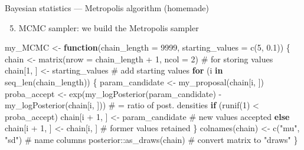 \documentclass[
  ignorenonframetext,
  aspectratio=169,
  t]{beamer}
\newenvironment{Shaded}{\begin{snugshade}}{\end{snugshade}}
\newcommand{\AttributeTok}[1]{\textcolor[rgb]{0.40,0.45,0.13}{#1}}
\newcommand{\CommentTok}[1]{\textcolor[rgb]{0.37,0.37,0.37}{#1}}
\newcommand{\ControlFlowTok}[1]{\textcolor[rgb]{0.00,0.23,0.31}{\textbf{#1}}}
\newcommand{\DecValTok}[1]{\textcolor[rgb]{0.68,0.00,0.00}{#1}}
\newcommand{\FloatTok}[1]{\textcolor[rgb]{0.68,0.00,0.00}{#1}}
\newcommand{\FunctionTok}[1]{\textcolor[rgb]{0.28,0.35,0.67}{#1}}
\newcommand{\NormalTok}[1]{\textcolor[rgb]{0.00,0.23,0.31}{#1}}
\newcommand{\OtherTok}[1]{\textcolor[rgb]{0.00,0.23,0.31}{#1}}
\newcommand{\SpecialCharTok}[1]{\textcolor[rgb]{0.37,0.37,0.37}{#1}}
\newcommand{\StringTok}[1]{\textcolor[rgb]{0.13,0.47,0.30}{#1}}
\providecommand{\tightlist}{%
  \setlength{\itemsep}{0pt}\setlength{\parskip}{0pt}}
\newcommand{\bluenorm}[1]{\textcolor{bluebeamer}{#1}}
\begin{document}
\begin{frame}[fragile]{Bayesian statistics --- Metropolis algorithm
(homemade)}
\protect{}\label{bayesian-statistics-metropolis-algorithm-homemade-4}
\begin{enumerate}
\setcounter{enumi}{4}
\tightlist
\item
  \bluenorm{MCMC sampler}: we build the Metropolis sampler
\end{enumerate}

\footnotesize

\begin{Shaded}
\begin{Highlighting}[]
\NormalTok{my\_MCMC }\OtherTok{\textless{}{-}} \ControlFlowTok{function}\NormalTok{(}\AttributeTok{chain\_length =} \DecValTok{9999}\NormalTok{, }\AttributeTok{starting\_values =} \FunctionTok{c}\NormalTok{(}\DecValTok{5}\NormalTok{, }\FloatTok{0.1}\NormalTok{)) \{}
\NormalTok{    chain }\OtherTok{\textless{}{-}} \FunctionTok{matrix}\NormalTok{(}\AttributeTok{nrow =}\NormalTok{ chain\_length }\SpecialCharTok{+} \DecValTok{1}\NormalTok{, }\AttributeTok{ncol =} \DecValTok{2}\NormalTok{) }\CommentTok{\# for storing values}
\NormalTok{    chain[}\DecValTok{1}\NormalTok{, ] }\OtherTok{\textless{}{-}}\NormalTok{ starting\_values }\CommentTok{\# add starting values}
    \ControlFlowTok{for}\NormalTok{ (i }\ControlFlowTok{in} \FunctionTok{seq\_len}\NormalTok{(chain\_length)) \{}
\NormalTok{        param\_candidate }\OtherTok{\textless{}{-}} \FunctionTok{my\_proposal}\NormalTok{(chain[i, ])}
\NormalTok{        proba\_accept }\OtherTok{\textless{}{-}} \FunctionTok{exp}\NormalTok{(}\FunctionTok{my\_logPosterior}\NormalTok{(param\_candidate) }\SpecialCharTok{{-}}
                              \FunctionTok{my\_logPosterior}\NormalTok{(chain[i, ])) }\CommentTok{\# = ratio of post. densities}
        \ControlFlowTok{if}\NormalTok{ (}\FunctionTok{runif}\NormalTok{(}\DecValTok{1}\NormalTok{) }\SpecialCharTok{\textless{}}\NormalTok{ proba\_accept)}
\NormalTok{            chain[i }\SpecialCharTok{+} \DecValTok{1}\NormalTok{, ] }\OtherTok{\textless{}{-}}\NormalTok{ param\_candidate }\CommentTok{\# new values accepted}
        \ControlFlowTok{else}
\NormalTok{            chain[i }\SpecialCharTok{+} \DecValTok{1}\NormalTok{, ] }\OtherTok{\textless{}{-}}\NormalTok{ chain[i, ] }\CommentTok{\# former values retained}
\NormalTok{    \}}
    \FunctionTok{colnames}\NormalTok{(chain) }\OtherTok{\textless{}{-}} \FunctionTok{c}\NormalTok{(}\StringTok{"mu"}\NormalTok{, }\StringTok{"sd"}\NormalTok{) }\CommentTok{\# name columns}
\NormalTok{    posterior}\SpecialCharTok{::}\FunctionTok{as\_draws}\NormalTok{(chain) }\CommentTok{\# convert matrix to "draws"}
\NormalTok{\}}
\end{Highlighting}
\end{Shaded}

\normalsize
\end{frame}
\end{document}

